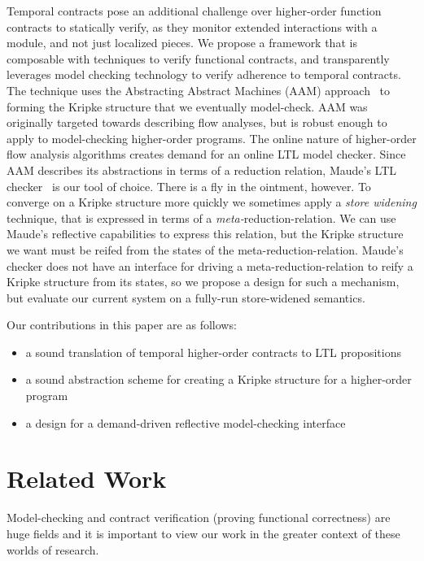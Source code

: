 \documentclass[preprint,onecolumn,9pt]{sigplanconf} %
\begin{document}
Temporal contracts pose an additional challenge over higher-order function contracts to statically verify, as they monitor extended interactions with a module, and not just localized pieces.
%
We propose a framework that is composable with techniques to verify functional contracts, and transparently leverages model checking technology to verify adherence to temporal contracts.
%
The technique uses the Abstracting Abstract Machines (AAM) approach~\citet{dvanhorn:VanHorn2010Abstracting} to forming the Kripke structure that we eventually model-check.
%
AAM was originally targeted towards describing flow analyses, but is robust enough to apply to model-checking higher-order programs.
%
The online nature of higher-order flow analysis algorithms creates demand for an online LTL model checker.
%
Since AAM describes its abstractions in terms of a reduction relation, Maude's LTL checker~\citep{ianjohnson:EMSltl_2002} is our tool of choice.
%
There is a fly in the ointment, however.
%
To converge on a Kripke structure more quickly we sometimes apply a \emph{store widening} technique, that is expressed in terms of a \emph{meta-}reduction-relation.
%
We can use Maude's reflective capabilities to express this relation, but the Kripke structure we want must be reifed from the states of the meta-reduction-relation.
%
Maude's checker does not have an interface for driving a meta-reduction-relation to reify a Kripke structure from its states, so we propose a design for such a mechanism, but evaluate our current system on a fully-run store-widened semantics.

Our contributions in this paper are as follows:
\begin{itemize}
 \item{a sound translation of temporal higher-order contracts to LTL propositions}
 \item{a sound abstraction scheme for creating a Kripke structure for a higher-order program}
 \item{a design for a demand-driven reflective model-checking interface}
\end{itemize}

\section{Related Work}

Model-checking and contract verification (proving functional correctness) are huge fields and it is important to view our work in the greater context of these worlds of research.
\end{document}
